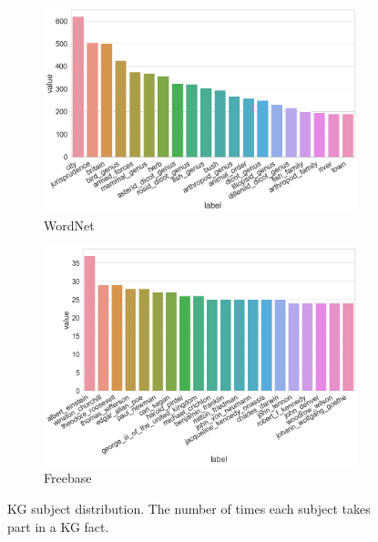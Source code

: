\begin{figure}[H]
	\begin{subfigure}[b]{.5\linewidth}
   		\centering
    		\includegraphics[width=0.9\linewidth, height=0.6\linewidth]{Wordnet_Subject_Counts}
		\captionsetup{justification=centering}
		\caption{WordNet}
	\end{subfigure}
	\begin{subfigure}[b]{.5\linewidth}
   		\centering
		\includegraphics[width=0.9\linewidth, height=0.6\linewidth]{Freebase_Subject_Counts}
		\captionsetup{justification=centering}
		\caption{Freebase}
	\end{subfigure}
	\captionsetup{justification=centering}
	\caption{KG subject distribution. The number of times each subject takes part in a KG fact.}
\end{figure}

